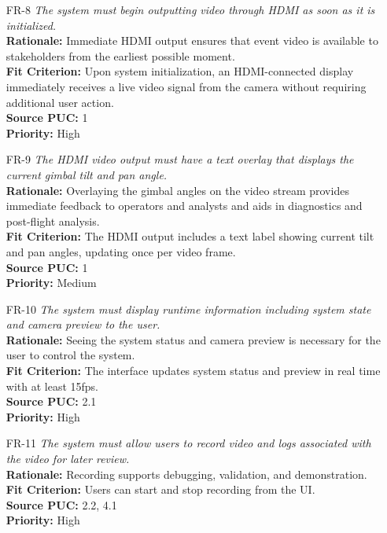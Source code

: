 \documentclass[12pt]{article}
\begin{document}
\begin{itemize}[leftmargin=*]
  \item[FR-8] \emph{The system must begin outputting video through HDMI as soon as it
          is initialized.}\\[2mm]
        \textbf{Rationale:} Immediate HDMI output ensures that event video is available to stakeholders from the earliest possible moment.\\
        \textbf{Fit Criterion:} Upon system initialization, an HDMI-connected display immediately receives a live video signal from the camera without requiring additional user action.\\
        \textbf{Source PUC:} 1 \\
        \textbf{Priority:} High

  \item[FR-9] \emph{The HDMI video output must have a text overlay that displays the
          current gimbal tilt and pan angle.}\\[2mm]
        \textbf{Rationale:} Overlaying the gimbal angles on the video stream provides immediate feedback to operators and analysts and aids in diagnostics and post-flight analysis.\\
        \textbf{Fit Criterion:} The HDMI output includes a text label showing current tilt and pan angles, updating once per video frame.\\
        \textbf{Source PUC:} 1 \\
        \textbf{Priority:} Medium

  \item[FR-10] \emph{The system must display runtime information including system state
          and camera preview to the user.}\\[2mm]
        \textbf{Rationale:} Seeing the system status and camera preview is necessary for the user to control the system.\\
        \textbf{Fit Criterion:} The interface updates system status and preview in real time with at least 15fps.\\
        \textbf{Source PUC:} 2.1 \\
        \textbf{Priority:} High

  \item[FR-11] \emph{The system must allow users to record video and logs associated
          with the video for later review.}\\[2mm]
        \textbf{Rationale:} Recording supports debugging, validation, and demonstration.\\
        \textbf{Fit Criterion:} Users can start and stop recording from the UI.\\
        \textbf{Source PUC:} 2.2, 4.1 \\
        \textbf{Priority:} High


\end{itemize}
\end{document}
